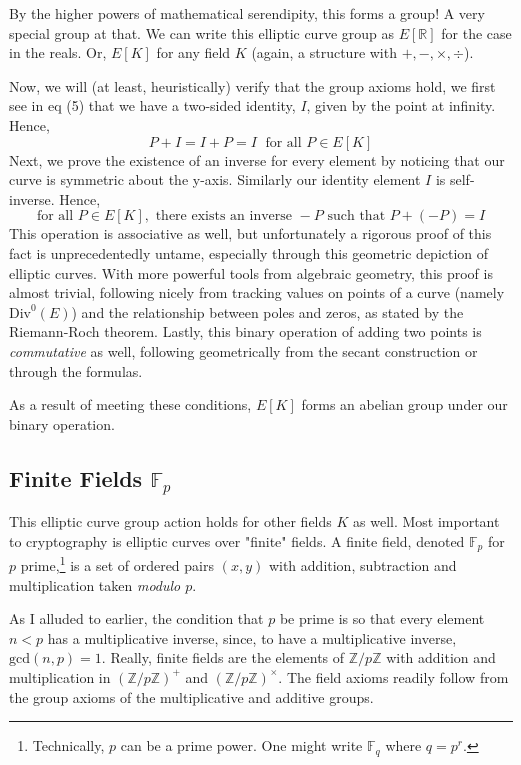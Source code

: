 \documentclass[11pt, a4paper]{report}
\newcommand{\integers}{\mathbb{Z}}
\newcommand{\reals}{\mathbb{R}}
\newcommand{\field}{\mathbb{F}}
\begin{document}
By the higher powers of mathematical serendipity, this forms a group! A very special group at that. We can write this elliptic curve group as $E[\reals]$ for the case in the reals. Or, $E[K]$ for any field $K$ (again, a structure with $+, -, \times, \div$).

	Now, we will (at least, heuristically) verify that the group axioms hold, we first see in eq (5) that we have a two-sided identity, $I$, given by the point at infinity. Hence,
\[ P + I = I + P = I \; \text{ for all } P \in E[K] \]
Next, we prove the existence of an inverse for every element by noticing that our curve is symmetric about the y-axis. Similarly our identity element $I$ is self-inverse. Hence,
\[ \text{for all } P \in E[K], \text{ there exists an inverse } -P \text{ such that } P + (-P) = I \]
This operation is associative as well, but unfortunately a rigorous proof of this fact is unprecedentedly untame, especially through this geometric depiction of elliptic curves. With more powerful tools from algebraic geometry, this proof is almost trivial, following nicely from  tracking values on points of a curve (namely $\mathrm{Div}^0(E)$) and the relationship between poles and zeros, as stated by the Riemann-Roch theorem.\autocite[66]{silverman}
Lastly, this binary operation of adding two points is \textit{commutative} as well, following geometrically from the secant construction or through the formulas.

As a result of meeting these conditions, $E[K]$ forms an abelian group under our binary operation.

\subsection{Finite Fields $\field_p$}

This elliptic curve group action holds for other fields $K$ as well. Most important to cryptography is elliptic curves over "finite" fields. 
A finite field, denoted $\field_p$ for $p$ prime,\footnote{Technically, $p$ can be a prime power. 
One might write $\field_q$ where $q = p^r$.} is a set of ordered pairs $(x,y)$ with addition, subtraction and multiplication taken \textit{modulo $p$}. 

As I alluded to earlier, the condition that $p$ be prime is so that every element $n < p$ has a multiplicative inverse, since, to have a multiplicative inverse, $\mathrm{gcd}(n,p)=1$. Really, finite fields are the elements of $\integers / p \integers$ with addition and multiplication in $(\integers / p \integers)^{+}$ and $(\integers / p \integers)^{\times}$. The field axioms readily follow from the group axioms of the multiplicative and additive groups.
\end{document}
